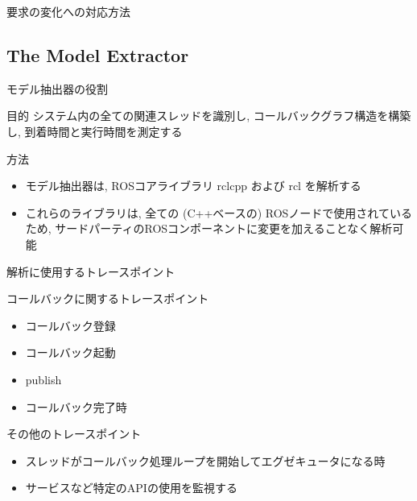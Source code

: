 \begin{frame}{要求の変化への対応方法}
\end{frame}


\subsection{The Model Extractor}
\label{ssec: the model extractor}

\begin{frame}{モデル抽出器の役割}
    \begin{block}{目的}
        システム内の全ての関連スレッドを識別し, コールバックグラフ構造を構築し, 到着時間と実行時間を測定する
    \end{block}
    \begin{block}{方法}
        \setlength{\linewidth}{0.98\columnwidth}
        \begin{itemize}
            \item モデル抽出器は, ROSコアライブラリ $\mathrm{rclcpp}$ および $\mathrm{rcl}$ を解析する
            \item これらのライブラリは, 全ての (C++ベースの) ROSノードで使用されているため, サードパーティのROSコンポーネントに変更を加えることなく解析可能
        \end{itemize}
    \end{block}
\end{frame}

\begin{frame}{解析に使用するトレースポイント}
    \vspace{1mm}
    \begin{block}{コールバックに関するトレースポイント}
        \setlength{\linewidth}{0.98\columnwidth}
        \begin{itemize}
            \item コールバック登録
            \item コールバック起動
            \item publish
            \item コールバック完了時
        \end{itemize}
    \end{block}
    \begin{block}{その他のトレースポイント}
        \setlength{\linewidth}{0.98\columnwidth}
        \begin{itemize}
            \item スレッドがコールバック処理ループを開始してエグゼキュータになる時
            \item サービスなど特定のAPIの使用を監視する
        \end{itemize}
    \end{block}
\end{frame}

